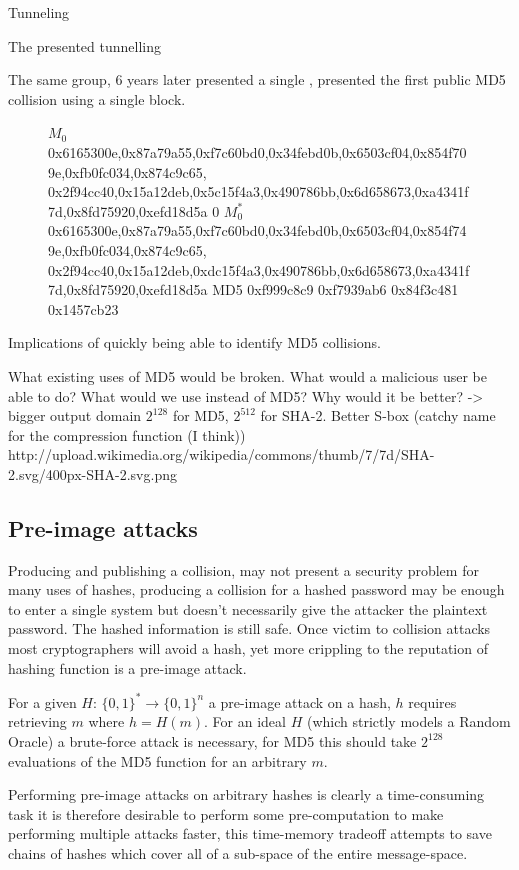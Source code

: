 \documentclass[a4paper,12pt]{article}
\begin{document}
Tunneling

The  \cite{Klima2006} presented tunnelling 

The same group, 6 years later presented a single \cite{Xie2013}, presented the first public MD5 collision using a single block.
\begin{figure}
$M_0$
0x6165300e,0x87a79a55,0xf7c60bd0,0x34febd0b,0x6503cf04,0x854f709e,0xfb0fc034,0x874c9c65, 0x2f94cc40,0x15a12deb,0x5c15f4a3,0x490786bb,0x6d658673,0xa4341f7d,0x8fd75920,0xefd18d5a
0
$M_0^*$
0x6165300e,0x87a79a55,0xf7c60bd0,0x34febd0b,0x6503cf04,0x854f749e,0xfb0fc034,0x874c9c65, 0x2f94cc40,0x15a12deb,0xdc15f4a3,0x490786bb,0x6d658673,0xa4341f7d,0x8fd75920,0xefd18d5a
MD5 0xf999c8c9 0xf7939ab6 0x84f3c481 0x1457cb23

\end{figure}

Implications of quickly being able to identify MD5 collisions.

What existing uses of MD5 would be broken. What would a malicious user be able to do?
What would we use instead of MD5?
Why would it be better? -> bigger output domain $2^128$ for MD5, $2^512$ for SHA-2.
Better S-box (catchy name for the compression function (I think)) http://upload.wikimedia.org/wikipedia/commons/thumb/7/7d/SHA-2.svg/400px-SHA-2.svg.png



\subsection{Pre-image attacks}
Producing and publishing a collision, may not present a security problem for many uses of hashes, producing a collision for a hashed password may be enough to enter a single system but doesn't necessarily give the attacker the plaintext password. The hashed information is still safe. Once victim to collision attacks most cryptographers will avoid a hash\cite{dontusemd5}, yet more crippling to the reputation of hashing function is a pre-image attack.

For a given $H$: $\{0,1\}^* \rightarrow \{0,1\}^n$ a pre-image attack on a hash, $h$ requires retrieving $m$ where $h = H(m)$. For an ideal $H$ (which strictly models a Random Oracle) a brute-force attack is necessary, for MD5 this should take $2^{128}$ evaluations of the MD5 function for an arbitrary $m$.

Performing pre-image attacks on arbitrary hashes is clearly a time-consuming task it is therefore desirable to perform some pre-computation to make performing multiple attacks faster, this time-memory tradeoff attempts to save chains of hashes which cover all of a sub-space of the entire message-space. 
\end{document}
